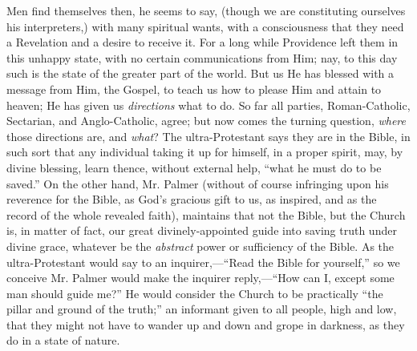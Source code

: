 Men find themselves then, he seems to say,
(though we are constituting ourselves his interpreters,) with many
spiritual wants, with a consciousness that they need a Revelation and
a desire to receive it. For a long while Providence left them in
this unhappy state, with no certain communications from Him; nay, to
this day such is the state of the greater part of the world. But us He
has blessed with a message from Him, the Gospel, to teach us how to
please Him and attain to heaven; He has given us \emph{directions}
what to do. So far all parties, Roman-Catholic, Sectarian, and
Anglo-Catholic, agree; but now comes the turning question, \emph{where}
those directions are, and \emph{what}? The ultra-Protestant says they
are in the Bible, in such sort that any individual taking it up for
himself, in a proper spirit, may, by divine blessing, learn thence,
without external help, ``what he must do to be saved.'' On the other
hand, Mr. Palmer (without of course infringing upon his reverence for
the Bible, as God's gracious gift to us, as inspired, and as the
record of the whole revealed faith), maintains that not the Bible, but
the Church is, in matter of fact, our great divinely-appointed guide
into saving truth under divine grace, whatever be the \emph{abstract}
power or sufficiency of the Bible. As the ultra-Protestant would say
to an inquirer,—``Read the Bible for yourself,'' so we conceive Mr.
Palmer would make the inquirer reply,—``How can I, except some man
should guide me?'' He would consider the Church to be practically ``the
pillar and ground of the truth;'' an informant given to all people,
high and low, that they might not have to wander up and down and grope
in darkness, as they do in a state of nature.


